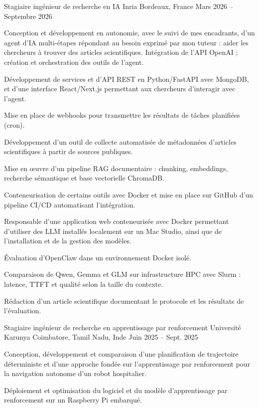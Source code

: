 
\begin{cventries}
  \cventry
    {Stagiaire ingénieur de recherche en IA}
    {Inria}
    {Bordeaux, France}
    {Mars 2026 -- Septembre 2026}
    {
      \begin{cvitems}
        \item {Conception et développement en autonomie, avec le suivi de mes encadrants, d’un agent d’IA multi-étapes répondant au besoin exprimé par mon tuteur : aider les chercheurs à trouver des articles scientifiques. Intégration de l’API OpenAI ; création et orchestration des outils de l’agent.}
        \item {Développement de services et d’API REST en Python/FastAPI avec MongoDB, et d’une interface React/Next.js permettant aux chercheurs d’interagir avec l’agent.}
        \item {Mise en place de webhooks pour transmettre les résultats de tâches planifiées (cron).}
        \item {Développement d’un outil de collecte automatisée de métadonnées d’articles scientifiques à partir de sources publiques.}
        \item {Mise en œuvre d’un pipeline RAG documentaire : chunking, embeddings, recherche sémantique et base vectorielle ChromaDB.}
        \item {Conteneurisation de certains outils avec Docker et mise en place sur GitHub d’un pipeline CI/CD automatisant l’intégration.}
        \item {Responsable d’une application web conteneurisée avec Docker permettant d’utiliser des LLM installés localement sur un Mac Studio, ainsi que de l’installation et de la gestion des modèles.}
        \item {Évaluation d’OpenClaw dans un environnement Docker isolé.}
        \item {Comparaison de Qwen, Gemma et GLM sur infrastructure HPC avec Slurm : latence, TTFT et qualité selon la taille du contexte.}
        \item {Rédaction d’un article scientifique documentant le protocole et les résultats de l’évaluation.}
      \end{cvitems}
    }

  \cventry
    {Stagiaire ingénieur de recherche en apprentissage par renforcement}
    {Université Karunya}
    {Coimbatore, Tamil Nadu, Inde}
    {Juin 2025 -- Sept. 2025}
    {
      \begin{cvitems}
        \item {Conception, développement et comparaison d’une planification de trajectoire déterministe et d’une approche fondée sur l’apprentissage par renforcement pour la navigation autonome d’un robot hospitalier.}
        \item {Déploiement et optimisation du logiciel et du modèle d’apprentissage par renforcement sur un Raspberry Pi embarqué.}
      \end{cvitems}
    }
\end{cventries}
